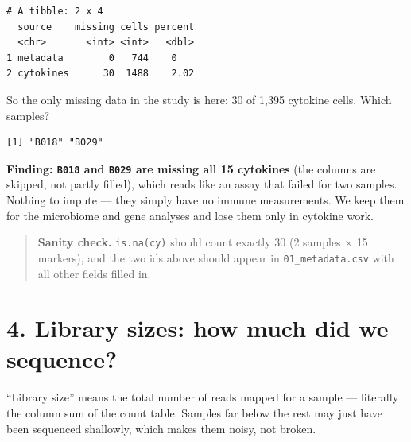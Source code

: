 \documentclass[
  letterpaper,
  DIV=11,
  numbers=noendperiod]{scrartcl}
\newenvironment{Shaded}{\begin{snugshade}}{\end{snugshade}}
\newcommand{\DecValTok}[1]{\textcolor[rgb]{0.68,0.00,0.00}{#1}}
\newcommand{\FunctionTok}[1]{\textcolor[rgb]{0.28,0.35,0.67}{#1}}
\newcommand{\NormalTok}[1]{\textcolor[rgb]{0.00,0.23,0.31}{#1}}
\newcommand{\OtherTok}[1]{\textcolor[rgb]{0.00,0.23,0.31}{#1}}
\newcommand{\SpecialCharTok}[1]{\textcolor[rgb]{0.37,0.37,0.37}{#1}}
\begin{document}
\begin{verbatim}
# A tibble: 2 x 4
  source    missing cells percent
  <chr>       <int> <int>   <dbl>
1 metadata        0   744    0   
2 cytokines      30  1488    2.02
\end{verbatim}

So the only missing data in the study is here: 30 of 1,395 cytokine
cells. Which samples?

\begin{Shaded}
\end{Shaded}

\begin{verbatim}
[1] "B018" "B029"
\end{verbatim}

\textbf{Finding: \texttt{B018} and \texttt{B029} are missing all 15
cytokines} (the columns are skipped, not partly filled), which reads
like an assay that failed for two samples. Nothing to impute --- they
simply have no immune measurements. We keep them for the microbiome and
gene analyses and lose them only in cytokine work.

\begin{quote}
\textbf{Sanity check.} \texttt{is.na(cy)} should count exactly 30 (2
samples × 15 markers), and the two ids above should appear in
\texttt{01\_metadata.csv} with all other fields filled in.
\end{quote}

\section{4. Library sizes: how much did we
sequence?}\label{library-sizes-how-much-did-we-sequence}

``Library size'' means the total number of reads mapped for a sample ---
literally the column sum of the count table. Samples far below the rest
may just have been sequenced shallowly, which makes them noisy, not
broken.
\end{document}
